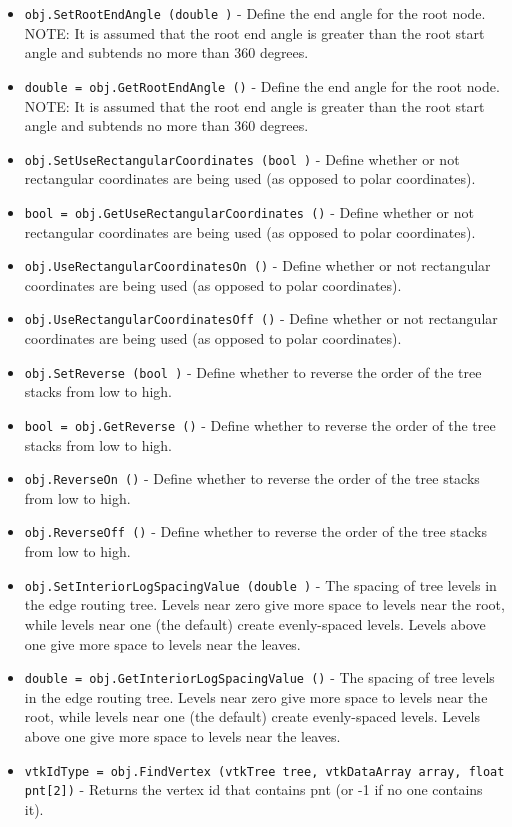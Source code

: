 \begin{itemize}
\item  \verb|obj.SetRootEndAngle (double )| -  Define the end angle for the root node.
 NOTE: It is assumed that the root end angle is greater than the
 root start angle and subtends no more than 360 degrees.

\item  \verb|double = obj.GetRootEndAngle ()| -  Define the end angle for the root node.
 NOTE: It is assumed that the root end angle is greater than the
 root start angle and subtends no more than 360 degrees.

\item  \verb|obj.SetUseRectangularCoordinates (bool )| -  Define whether or not rectangular coordinates are being used
 (as opposed to polar coordinates).

\item  \verb|bool = obj.GetUseRectangularCoordinates ()| -  Define whether or not rectangular coordinates are being used
 (as opposed to polar coordinates).

\item  \verb|obj.UseRectangularCoordinatesOn ()| -  Define whether or not rectangular coordinates are being used
 (as opposed to polar coordinates).

\item  \verb|obj.UseRectangularCoordinatesOff ()| -  Define whether or not rectangular coordinates are being used
 (as opposed to polar coordinates).

\item  \verb|obj.SetReverse (bool )| -  Define whether to reverse the order of the tree stacks from
 low to high.

\item  \verb|bool = obj.GetReverse ()| -  Define whether to reverse the order of the tree stacks from
 low to high.

\item  \verb|obj.ReverseOn ()| -  Define whether to reverse the order of the tree stacks from
 low to high.

\item  \verb|obj.ReverseOff ()| -  Define whether to reverse the order of the tree stacks from
 low to high.

\item  \verb|obj.SetInteriorLogSpacingValue (double )| -  The spacing of tree levels in the edge routing tree.
 Levels near zero give more space
 to levels near the root, while levels near one (the default)
 create evenly-spaced levels. Levels above one give more space
 to levels near the leaves.

\item  \verb|double = obj.GetInteriorLogSpacingValue ()| -  The spacing of tree levels in the edge routing tree.
 Levels near zero give more space
 to levels near the root, while levels near one (the default)
 create evenly-spaced levels. Levels above one give more space
 to levels near the leaves.

\item  \verb|vtkIdType = obj.FindVertex (vtkTree tree, vtkDataArray array, float pnt[2])| -  Returns the vertex id that contains pnt (or -1 if no one contains it).

\end{itemize}
